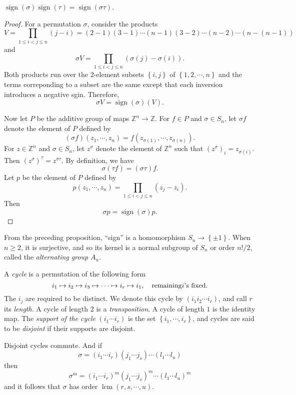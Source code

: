 \begin{proposition}
  \( \operatorname{sign}(\sigma) \operatorname{sign}(\tau) = \operatorname{sign}(\sigma \tau) \).
\end{proposition}
\begin{proof}
  For a permutation \( \sigma \), consider the products
  \[
    V = \prod_{1 \leq i < j \leq n} (j - i) = (2 - 1)(3 - 1) \cdots (n - 1)(3 - 2) \cdots (n - 2) \cdots (n - (n - 1))
  \]
  and
  \[
    \sigma V = \prod_{1 \leq i < j \leq n}(\sigma(j) - \sigma(i)).
  \]
  Both products run over the \( 2 \)-element subsets \( \left\lbrace i, j \right\rbrace \) of \( \left\lbrace 1, 2, \cdots, n \right\rbrace \) and the terms correponding to a subset are the same except that each inversion introduces a negative sgin.
  Therefore,
  \[
    \sigma V = \operatorname{sign}(\sigma)(V).
  \]

  Now let \( P \) be the additive group of maps \( \mathbb{Z}^n \to \mathbb{Z} \).
  For \( f \in P \) and \( \sigma \in S_n \), let \( \sigma f \) denote the element of \( P \) defined by
  \[
    (\sigma f)(z_1, \cdots, z_n) = f(z_{\sigma(1)}, \cdots, z_{\sigma(n)}).
  \]
  For \( z \in \mathbb{Z}^n \) and \( \sigma \in S_n \), let \( z^\sigma \) denote the element of \( \mathbb{Z}^n \) such that \( (z^\sigma)_i = z_{\sigma(i)} \).
  Then \( (z^\sigma)^\tau = z^{\sigma \tau} \).
  By definition, we have
  \[
    \sigma(\tau f) = (\sigma \tau)f.
  \]
  Let \( p \) be the element of \( P \) defined by
  \[
    p(z_1, \cdots, z_n) = \prod_{1 \leq i < j \leq n}(z_j - z_i).
  \]
  Then
  \[
    \sigma p = \operatorname{sign}(\sigma) p.
  \]
\end{proof}

\begin{definition}
  From the preceding proposition, ``sign'' is a homomorphism \( S_n \to \left\lbrace \pm 1 \right\rbrace \).
  When \( n \geq 2 \), it is surjective, and so its kernel is a normal subgroup of \( S_n \) or order \( n! / 2 \), called the \emph{alternating group} \( A_n \).
\end{definition}

\begin{definition}
  A \emph{cycle} is a permutation of the following form
  \[
    i_1 \mapsto i_2 \mapsto i_3 \mapsto \cdots \mapsto i_r \mapsto i_1,\quad \textmd{remaining} i \textmd{'s fixed.}
  \]
  The \( i_j \) are required to be distinct.
  We denote this cycle by \( (i_1 i_2 \cdots i_r) \), and call \( r \) its \emph{length}.
  A cycle of length \( 2 \) is a \emph{transposition}.
  A cycle of length \( 1 \) is the identity map.
  The \emph{support of the cycle} \( (i_1 \cdots i_r ) \) is the set \( \left\lbrace i_1, \cdots, i_r \right\rbrace \), and cycles are said to be \emph{disjoint} if their supports are disjoint.
\end{definition}
\begin{remark}
  Disjoint cycles commute.
  And if
  \[
    \sigma = (i_1 \cdots i_r)(j_1 \cdots j_s) \cdots (l_1 \cdots l_u)
  \]
  then
  \[
    \sigma^m = (i_1 \cdots i_r)^m(j_1 \cdots j_s)^m \cdots (l_1 \cdots l_u)^m
  \]
  and it follows that \( \sigma \) has order \( \operatorname{lcm}(r,s,\cdots, u) \).
\end{remark}

